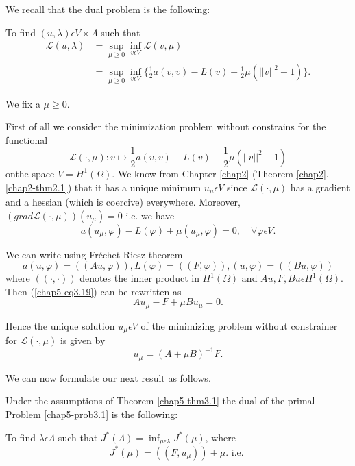 We recall that the dual problem is the following:

To find $(u, \lambda) \epsilon V \times \Lambda$ such that
\begin{align*}
\mathscr{L} (u, \lambda) & = \sup_{\mu \geq 0} \inf_{v \epsilon V} \mathscr{L} (v, \mu)\\
& = \sup_{\mu \geq 0} \inf_{v \epsilon V} \{\frac{1}{2} a(v, v) - L(v) + \frac{1}{2} \mu (||v||^{2} - 1) \}.
\end{align*}

We fix a $\mu \geq 0$.

First of all we consider the minimization problem without constrains for the functional
$$
\mathscr{L} (\cdot ,  \mu) : v \mapsto \frac{1}{2} a(v, v) - L(v) + \frac{1}{2} \mu (||v||^{2} - 1) 
$$
on\pageoriginale the space $V = H^{1}(\Omega)$. We know from Chapter \ref{chap2} (Theorem \ref{chap2}. \ref{chap2-thm2.1}) that it has a unique minimum $u_{\mu} \epsilon V$ since $\mathscr{L} (\cdot , \mu)$ has a gradient and a hessian (which is coercive) everywhere. Moreover, $(grad \mathscr{L} (\cdot , \mu)) (u_{\mu}) = 0$ i.e. we have
\begin{equation*}
a(u_{\mu}, \varphi) - L(\varphi) + \mu(u_{\mu}, \varphi) = 0, \quad \forall \varphi \epsilon V. \tag{3.19}\label{chap5-eq3.19}
\end{equation*}

We can write using Fr\'{e}chet-Riesz theorem
$$
a(u, \varphi) = ((Au, \varphi)), L(\varphi) = ((F, \varphi)), (u, \varphi) = ((Bu, \varphi))
$$
where $((\cdot , \cdot))$ denotes the inner product in $H^{1} (\Omega)$ and $Au, F, Bu \epsilon H^{1} (\Omega)$. Then (\ref{chap5-eq3.19}) can be rewritten as
\begin{equation*}
Au_{\mu} - F + \mu B u_{\mu} = 0.\tag{3.20}\label{chap5-eq3.20}
\end{equation*}

Hence the unique solution $u_{\mu} \epsilon V$ of the minimizing problem without constrainer for $\mathscr{L} (\cdot , \mu)$ is given by
\begin{equation*}
u_{\mu} = (A + \mu B)^{-1} F.\tag{3.21}\label{chap5-eq3.21}
\end{equation*}

We can now formulate our next result as follows.

\begin{theorem}\label{chap5-thm3.2}
Under the assumptions of Theorem \ref{chap5-thm3.1} the dual of the primal Problem \ref{chap5-prob3.1} is the following:

To find $\lambda \epsilon \Lambda$ such that $J^{*} (\Lambda) = \inf_{\mu \epsilon \lambda} J^{*} (\mu)$, where
\begin{equation*}
J^{*} (\mu) = ((F, u_{\mu})) + \mu. \text{ i.e. }\tag{3.22}\label{chap5-eq3.22}
\end{equation*}
\end{theorem}

